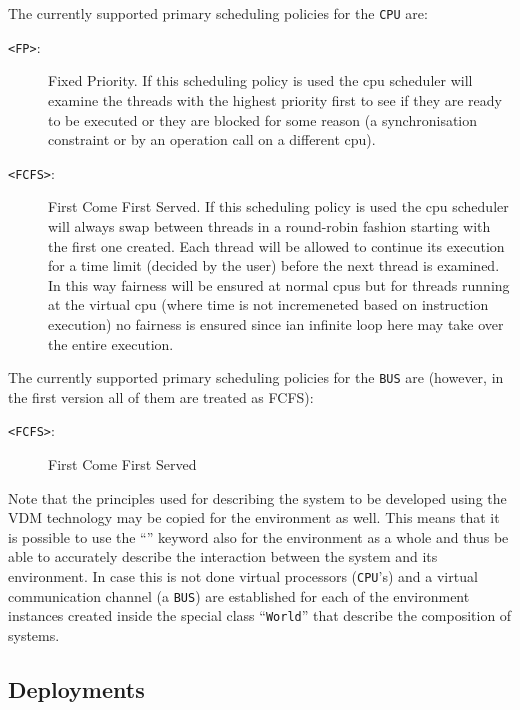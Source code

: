 \documentclass{overturerepchap}
\newcommand{\keyw}[1]{{\bf\ttfamily{#1}}}
\begin{document}
The currently supported primary scheduling policies for the \texttt{CPU}
are:
\begin{description}
\item[\texttt{<FP>}:] Fixed Priority. If this scheduling policy is
  used the cpu scheduler will examine the threads with the highest
  priority first to see if they are ready to be executed or they are
  blocked for some reason (a synchronisation constraint or by an
  operation call on a different cpu).
\item[\texttt{<FCFS>}:] First Come First Served. If this scheduling
  policy is used the cpu scheduler will always swap between threads in
  a round-robin fashion starting with the first one created. Each
  thread will be allowed to continue its execution for a time limit
  (decided by the user) before the next thread is examined. In this
  way fairness will be ensured at normal cpus but for threads running
  at the virtual cpu (where time is not incremeneted based on
  instruction execution) no fairness is ensured since ian infinite
  loop here may take over the entire execution.
\end{description} 

The currently supported primary scheduling policies for the \texttt{BUS}
are (however, in the first version all of them are treated as FCFS):
\begin{description}
\item[\texttt{<FCFS>}:] First Come First Served
\end{description} 

Note that the principles used for describing the system to be developed using 
the VDM technology may be copied for the environment as well. This means that
it is possible to use the ``\keyw{system}'' keyword also for the environment as
a whole and thus be able to accurately describe the interaction between the
system and its environment. In case this is not done virtual processors 
(\texttt{CPU}'s)
and a virtual communication channel (a \texttt{BUS}) 
are established for each of the
environment instances created inside the special class ``\texttt{World}''
that describe the composition of systems.

\subsection{Deployments}
\end{document}

